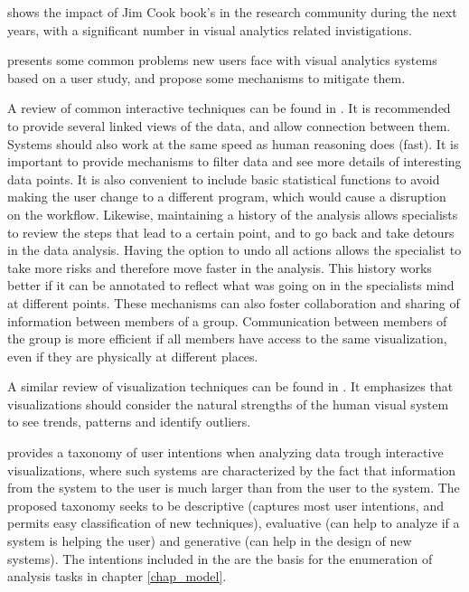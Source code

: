 \autocite{chen_illuminated_2012} shows the impact of Jim Cook book's in the research community during the next years, with a significant number in visual analytics related invistigations.
	
	
\autocite{chul_kwon_visual_2011} presents some common problems new users face with visual analytics systems based on a user study, and propose some mechanisms to mitigate them.
	
A review of common interactive techniques can be found in \autocite{heer_interactive_2012}. It is recommended to provide several linked views of the data, and allow connection between them. Systems should also work at the same speed as human reasoning does (fast). It is important to provide mechanisms to filter data and see more details of interesting data points. It is also convenient to include basic statistical functions to avoid making the user change to a different program, which would cause a disruption on the workflow. Likewise, maintaining a history of the analysis allows specialists to review the steps that lead to a certain point, and to go back and take detours in the data analysis. Having the option to undo all actions allows the specialist to take more risks and therefore move faster in the analysis. This history works better if it can be annotated to reflect what was going on in the specialists mind at different points. These mechanisms can also foster collaboration and sharing of information between members of a group. Communication between members of the group is more efficient if all members have access to the same visualization, even if they are physically at different places.

A similar review of visualization techniques can be found in \autocite{heer_tour_2010}. It emphasizes that visualizations should consider the natural strengths of the human visual system to see trends, patterns and identify outliers.



\autocite{yi_toward_2007} provides a taxonomy of user intentions when analyzing data trough interactive visualizations, where such systems are characterized by the fact that information from the system to the user is much larger than from the user to the system. The proposed taxonomy seeks to be descriptive (captures most user intentions, and permits easy classification of new techniques), evaluative (can help to analyze if a system is helping the user) and generative (can help in the design of new systems). The intentions included in the are the basis for the enumeration of analysis tasks in chapter \ref{chap_model}.

